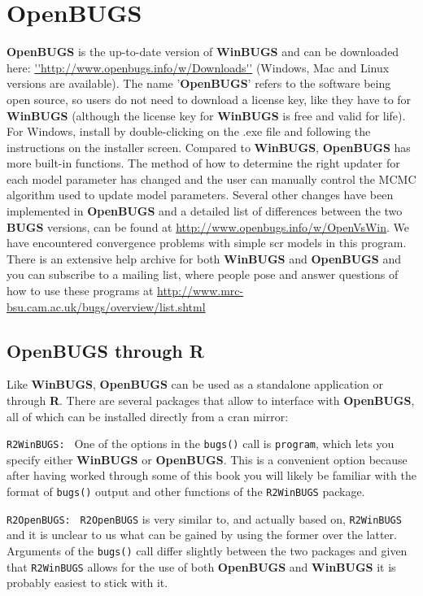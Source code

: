 \section{OpenBUGS}
{\bf OpenBUGS} is the up-to-date version of {\bf WinBUGS} and can be downloaded here: \url{''http://www.openbugs.info/w/Downloads''} (Windows, Mac and Linux versions are available).  The
name '{\bf OpenBUGS}' refers to the software being open source, so users 
do
not need to download a license key, like they have to for {\bf WinBUGS}
(although the license key for {\bf WinBUGS} is free and valid for life). For Windows, install by double-clicking on the .exe file and following the instructions on the installer screen. Compared to {\bf WinBUGS}, {\bf OpenBUGS} 
has  more built-in functions. The
method of how to determine the right updater for each model parameter
has changed and the user can manually control the MCMC algorithm used
to update model parameters.  Several other changes have been
implemented in {\bf OpenBUGS} and a detailed list of differences between the
two {\bf BUGS} versions, can be found at
\url{http://www.openbugs.info/w/OpenVsWin}. We have encountered convergence problems with simple scr models in this program. 
There is an extensive help archive for both {\bf WinBUGS} and {\bf OpenBUGS}
 and you can subscribe to a mailing list, where people pose and answer 
 questions of how to use these programs at 
 \url{http://www.mrc-bsu.cam.ac.uk/bugs/overview/list.shtml}

\subsection{OpenBUGS through R}
Like {\bf WinBUGS}, {\bf OpenBUGS} can be used as a standalone application or through {\bf R}. There are several packages that allow {\R} to interface with {\bf OpenBUGS}, all of which can be installed directly from a cran mirror:

{\flushleft \tt R2WinBUGS: }
One of the options in the {\tt bugs()} call is {\tt program}, which lets you specify either {\bf WinBUGS} or {\bf OpenBUGS}. This is a convenient option because after having worked through some of this book you will likely be familiar with the format of {\tt bugs()} output and other functions of the {\tt R2WinBUGS} package.

{\flushleft \tt R2OpenBUGS: }
{\tt R2OpenBUGS} \citep{sturtz_etal:2005} is very similar to, and actually based on, {\tt R2WinBUGS} and it is unclear to us what can be gained by using the former over the latter. Arguments of the {\tt bugs()} call differ slightly between the two packages and given that {\tt R2WinBUGS} allows for the use of both {\bf OpenBUGS} and {\bf WinBUGS} it is probably easiest to stick with it. 

